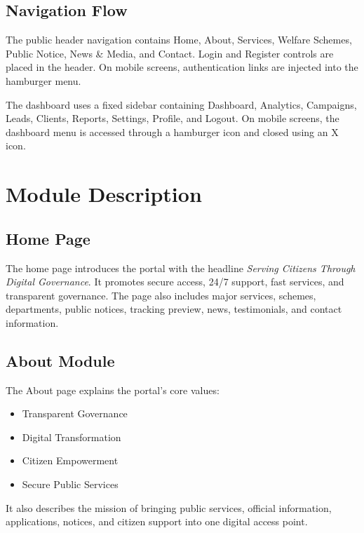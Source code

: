 \documentclass[12pt,a4paper]{report}
\begin{document}
\section{Navigation Flow}
The public header navigation contains Home, About, Services, Welfare Schemes, Public Notice, News \& Media, and Contact. Login and Register controls are placed in the header. On mobile screens, authentication links are injected into the hamburger menu.

The dashboard uses a fixed sidebar containing Dashboard, Analytics, Campaigns, Leads, Clients, Reports, Settings, Profile, and Logout. On mobile screens, the dashboard menu is accessed through a hamburger icon and closed using an X icon.

\chapter{Module Description}
\section{Home Page}
The home page introduces the portal with the headline \textit{Serving Citizens Through Digital Governance}. It promotes secure access, 24/7 support, fast services, and transparent governance. The page also includes major services, schemes, departments, public notices, tracking preview, news, testimonials, and contact information.

\section{About Module}
The About page explains the portal's core values:
\begin{itemize}[leftmargin=0.4in]
    \item Transparent Governance
    \item Digital Transformation
    \item Citizen Empowerment
    \item Secure Public Services
\end{itemize}

It also describes the mission of bringing public services, official information, applications, notices, and citizen support into one digital access point.
\end{document}
